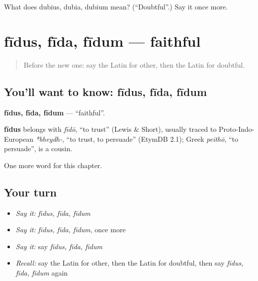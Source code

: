 \begin{tcolorbox}[breakable,colback=teal!4,colframe=teal!35!black,title={Before you move on}]
What does dubius, dubia, dubium mean? (\textquotedblleft{}Doubtful\textquotedblright{}.) Say it once more.
\end{tcolorbox}
\section[fīdus, fīda, fīdum]{fīdus, fīda, fīdum — faithful}

\label{lesson:LA-C243-fidus}



\begin{quote}
Before the new one: say the Latin for other, then the Latin for doubtful.
\end{quote}

\subsection*{You'll want to know: fīdus, fīda, fīdum}
\textbf{fīdus, fīda, fīdum} — \textquotedblleft{}faithful\textquotedblright{}.

\begin{cousinweb}
\textbf{fīdus} belongs with \emph{fīdō}, \textquotedblleft{}to trust\textquotedblright{} (Lewis \& Short), usually traced to Proto-Indo-European \emph{*bheydh-}, \textquotedblleft{}to trust, to persuade\textquotedblright{} (EtymDB 2.1); Greek \emph{peithō}, \textquotedblleft{}to persuade\textquotedblright{}, is a cousin.
\end{cousinweb}

\begin{grammarlens}[title={What you've built}]
One more word for this chapter.
\end{grammarlens}

\subsection*{Your turn}
\begin{itemize}
\raggedright
  \item \emph{Say it:} \emph{fīdus, fīda, fīdum}
  \item \emph{Say it:} \emph{fīdus, fīda, fīdum}, once more
  \item \emph{Say it:} say \emph{fīdus, fīda, fīdum}
  \item \emph{Recall:} say the Latin for other, then the Latin for doubtful, then say \emph{fīdus, fīda, fīdum} again
\end{itemize}

